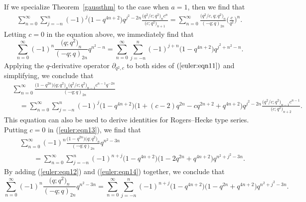 \documentclass[pdftex]{sigma}
\numberwithin{equation}{section}
\begin{document}
 If we specialize Theorem~\ref{gaussthm} to the case when $a=1$, then we find that
 \begin{align}\label{euler:eqn11}
 	\sum_{n=0}^\infty \sum_{j=-n}^n (-1)^j \bigl(1-q^{4n+2}\bigr)	q^{j^2-2n}
 	\frac{\bigl(q^2/c; q^2\bigr)_n c^n}{\bigl(c; q^2\bigr)_{n+1}}
 	=\sum_{n=0}^\infty \frac{\bigl(q^2/c, q; q^2\bigr)_n}{(-q; q)_{2n}}\biggl(\frac{c}{q^2}\biggr)^n.
 \end{align}
Letting $c=0$ in the equation above, we immediately find that
\begin{equation}\label{euler:eqn12}
\sum_{n=0}^\infty (-1)^n \frac{\bigl(q; q^2\bigr)_n}{(-q; q)_{2n}} q^{n^2-n}
= \sum_{n=0}^\infty \sum_{j=-n}^n (-1)^{j+n} \bigl(1-q^{4n+2}\bigr)	q^{j^2+n^2-n}.
\end{equation}	
Applying the $q$-derivative operator $\partial_{q^2, c}$ to both sides of $(\ref{euler:eqn11})$ and simplifying, we conclude that
\begin{align}\label{euler:eqn13}
 &\sum_{n=0}^\infty \frac{\bigl(1-q^{2n}\bigr)\bigl(q; q^2\bigr)_n\bigl(q^2/c; q^2\bigr)_{n-1}c^{n-1}q^{-2n}}{(-q; q)_{2n}}\\
 &\quad{}=\sum_{n=0}^\infty \sum_{j=-n}^n (-1)^j \bigl(1-q^{4n+2}\bigr) \bigl(1+(c-2)q^{2n}-cq^{2n+2}+q^{4n+2}\bigr)	q^{j^2-2n}
 	\frac{\bigl(q^2/c; q^2\bigr)_{n-1} c^{n-1}}{\bigl(c; q^2\bigr)_{n+2}}. \nonumber
 \end{align}
This equation can also be used to derive identities for Rogers--Hecke type series. Putting $c=0$ in (\ref{euler:eqn13}), we find that
\begin{align}
&\sum_{n=0}^{\infty} (-1)^n \frac{\bigl(1-q^{2n}\bigr)\bigl(q; q^2\bigr)_n }{(-q; q)_{2n}} q^{n^2-3n}\nonumber\\
&\qquad{}=\sum_{n=0}^\infty \sum_{j=-n}^n (-1)^{n+j} \bigl(1-q^{4n+2}\bigr) \bigl(1-2q^{2n}+q^{4n+2}\bigr)	q^{n^2+j^2-3n}.\label{euler:eqn14}
\end{align}
By adding (\ref{euler:eqn12}) and (\ref{euler:eqn14}) together, we conclude that
\begin{equation*}%
\sum_{n=0}^{\infty} (-1)^n \frac{\bigl(q; q^2\bigr)_n }{(-q; q)_{2n}} q^{n^2-3n}
=\sum_{n=0}^\infty \sum_{j=-n}^n (-1)^{n+j} \bigl(1-q^{4n+2}\bigr) \bigl(1-q^{2n}+q^{4n+2}\bigr)	q^{n^2+j^2-3n}.
\end{equation*}
\end{document}
